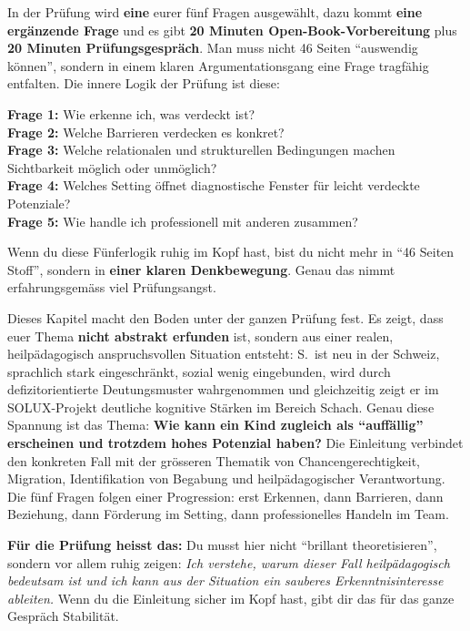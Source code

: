 \documentclass[ngerman, a4paper]{article}
\begin{document}
\begin{kapitelueberblick}
In der Prüfung wird \textbf{eine} eurer fünf Fragen ausgewählt, dazu kommt
\textbf{eine ergänzende Frage} und es gibt \textbf{20 Minuten
Open-Book-Vorbereitung} plus \textbf{20 Minuten Prüfungsgespräch}. Man muss
nicht 46 Seiten \enquote{auswendig können}, sondern in einem klaren
Argumentationsgang eine Frage tragfähig entfalten. Die innere Logik der
Prüfung ist diese:

\medskip
\textbf{Frage 1:} Wie erkenne ich, was verdeckt ist?\\
\textbf{Frage 2:} Welche Barrieren verdecken es konkret?\\
\textbf{Frage 3:} Welche relationalen und strukturellen Bedingungen machen Sichtbarkeit möglich oder unmöglich?\\
\textbf{Frage 4:} Welches Setting öffnet diagnostische Fenster für leicht verdeckte Potenziale?\\
\textbf{Frage 5:} Wie handle ich professionell mit anderen zusammen?

\medskip Wenn du diese Fünferlogik ruhig im Kopf hast, bist du nicht mehr in
\enquote{46 Seiten Stoff}, sondern in \textbf{einer klaren Denkbewegung}.
Genau das nimmt erfahrungsgemäss viel Prüfungsangst.
\end{kapitelueberblick}

\begin{kapitelueberblick}
Dieses Kapitel macht den Boden unter der ganzen Prüfung fest. Es zeigt, dass euer Thema \textbf{nicht abstrakt erfunden} ist, sondern aus einer realen, heilpädagogisch anspruchsvollen Situation entsteht: S.\ ist neu in der Schweiz, sprachlich stark eingeschränkt, sozial wenig eingebunden, wird durch defizitorientierte Deutungsmuster wahrgenommen und gleichzeitig zeigt er im SOLUX-Projekt deutliche kognitive Stärken im Bereich Schach. Genau diese Spannung ist das Thema: \textbf{Wie kann ein Kind zugleich als \enquote{auffällig} erscheinen und trotzdem hohes Potenzial haben?} Die Einleitung verbindet den konkreten Fall mit der grösseren Thematik von Chancengerechtigkeit, Migration, Identifikation von Begabung und heilpädagogischer Verantwortung. Die fünf Fragen folgen einer Progression: erst Erkennen, dann Barrieren, dann Beziehung, dann Förderung im Setting, dann professionelles Handeln im Team.

\medskip\textbf{Für die Prüfung heisst das:} Du musst hier nicht \enquote{brillant theoretisieren}, sondern vor allem ruhig zeigen: \textit{Ich verstehe, warum dieser Fall heilpädagogisch bedeutsam ist und ich kann aus der Situation ein sauberes Erkenntnisinteresse ableiten.} Wenn du die Einleitung sicher im Kopf hast, gibt dir das für das ganze Gespräch Stabilität.
\end{kapitelueberblick}
\end{document}
